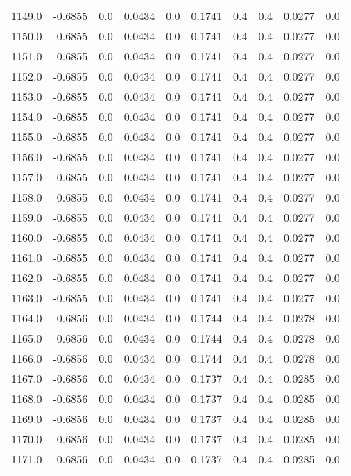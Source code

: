 \begin{longtable}{lrrrrrrrrr}
1149.0 & -0.6855 & 0.0 & 0.0434 & 0.0 & 0.1741 & 0.4 & 0.4 & 0.0277 & 0.0 \\
1150.0 & -0.6855 & 0.0 & 0.0434 & 0.0 & 0.1741 & 0.4 & 0.4 & 0.0277 & 0.0 \\
1151.0 & -0.6855 & 0.0 & 0.0434 & 0.0 & 0.1741 & 0.4 & 0.4 & 0.0277 & 0.0 \\
1152.0 & -0.6855 & 0.0 & 0.0434 & 0.0 & 0.1741 & 0.4 & 0.4 & 0.0277 & 0.0 \\
1153.0 & -0.6855 & 0.0 & 0.0434 & 0.0 & 0.1741 & 0.4 & 0.4 & 0.0277 & 0.0 \\
1154.0 & -0.6855 & 0.0 & 0.0434 & 0.0 & 0.1741 & 0.4 & 0.4 & 0.0277 & 0.0 \\
1155.0 & -0.6855 & 0.0 & 0.0434 & 0.0 & 0.1741 & 0.4 & 0.4 & 0.0277 & 0.0 \\
1156.0 & -0.6855 & 0.0 & 0.0434 & 0.0 & 0.1741 & 0.4 & 0.4 & 0.0277 & 0.0 \\
1157.0 & -0.6855 & 0.0 & 0.0434 & 0.0 & 0.1741 & 0.4 & 0.4 & 0.0277 & 0.0 \\
1158.0 & -0.6855 & 0.0 & 0.0434 & 0.0 & 0.1741 & 0.4 & 0.4 & 0.0277 & 0.0 \\
1159.0 & -0.6855 & 0.0 & 0.0434 & 0.0 & 0.1741 & 0.4 & 0.4 & 0.0277 & 0.0 \\
1160.0 & -0.6855 & 0.0 & 0.0434 & 0.0 & 0.1741 & 0.4 & 0.4 & 0.0277 & 0.0 \\
1161.0 & -0.6855 & 0.0 & 0.0434 & 0.0 & 0.1741 & 0.4 & 0.4 & 0.0277 & 0.0 \\
1162.0 & -0.6855 & 0.0 & 0.0434 & 0.0 & 0.1741 & 0.4 & 0.4 & 0.0277 & 0.0 \\
1163.0 & -0.6855 & 0.0 & 0.0434 & 0.0 & 0.1741 & 0.4 & 0.4 & 0.0277 & 0.0 \\
1164.0 & -0.6856 & 0.0 & 0.0434 & 0.0 & 0.1744 & 0.4 & 0.4 & 0.0278 & 0.0 \\
1165.0 & -0.6856 & 0.0 & 0.0434 & 0.0 & 0.1744 & 0.4 & 0.4 & 0.0278 & 0.0 \\
1166.0 & -0.6856 & 0.0 & 0.0434 & 0.0 & 0.1744 & 0.4 & 0.4 & 0.0278 & 0.0 \\
1167.0 & -0.6856 & 0.0 & 0.0434 & 0.0 & 0.1737 & 0.4 & 0.4 & 0.0285 & 0.0 \\
1168.0 & -0.6856 & 0.0 & 0.0434 & 0.0 & 0.1737 & 0.4 & 0.4 & 0.0285 & 0.0 \\
1169.0 & -0.6856 & 0.0 & 0.0434 & 0.0 & 0.1737 & 0.4 & 0.4 & 0.0285 & 0.0 \\
1170.0 & -0.6856 & 0.0 & 0.0434 & 0.0 & 0.1737 & 0.4 & 0.4 & 0.0285 & 0.0 \\
1171.0 & -0.6856 & 0.0 & 0.0434 & 0.0 & 0.1737 & 0.4 & 0.4 & 0.0285 & 0.0 \\

\end{longtable}
